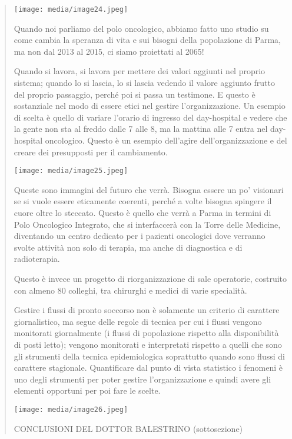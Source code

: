\documentclass[]{article}
\begin{document}
\begin{quote}
\texttt{[image: media/image24.jpeg]}

Quando noi parliamo del polo oncologico, abbiamo fatto uno studio su
come cambia la speranza di vita e sui bisogni della popolazione di
Parma, ma non dal 2013 al 2015, ci siamo proiettati al 2065!

Quando si lavora, si lavora per mettere dei valori aggiunti nel proprio
sistema; quando lo si lascia, lo si lascia vedendo il valore aggiunto
frutto del proprio passaggio, perché poi si passa un testimone. E questo
è sostanziale nel modo di essere etici nel gestire l'organizzazione. Un
esempio di scelta è quello di variare l'orario di ingresso del
day-hospital e vedere che la gente non sta al freddo dalle 7 alle 8, ma
la mattina alle 7 entra nel day-hospital oncologico. Questo è un esempio
dell'agire dell'organizzazione e del creare dei presupposti per il
cambiamento.

\texttt{[image: media/image25.jpeg]}

Queste sono immagini del futuro che verrà. Bisogna essere un po'
visionari se si vuole essere eticamente coerenti, perché a volte bisogna
spingere il cuore oltre lo steccato. Questo è quello che verrà a Parma
in termini di Polo Oncologico Integrato, che si interfaccerà con la
Torre delle Medicine, diventando un centro dedicato per i pazienti
oncologici dove verranno svolte attività non solo di terapia, ma anche
di diagnostica e di radioterapia.

Questo è invece un progetto di riorganizzazione di sale operatorie,
costruito con almeno 80 colleghi, tra chirurghi e medici di varie
specialità.

Gestire i flussi di pronto soccorso non è solamente un criterio di
carattere giornalistico, ma segue delle regole di tecnica per cui i
flussi vengono monitorati giornalmente (i flussi di popolazione rispetto
alla disponibilità di posti letto); vengono monitorati e interpretati
rispetto a quelli che sono gli strumenti della tecnica epidemiologica
soprattutto quando sono flussi di carattere stagionale. Quantificare dal
punto di vista statistico i fenomeni è uno degli strumenti per poter
gestire l'organizzazione e quindi avere gli elementi opportuni per poi
fare le scelte.

\texttt{[image: media/image26.jpeg]}

CONCLUSIONI DEL DOTTOR BALESTRINO (sottosezione)


\end{quote}
\end{document}
